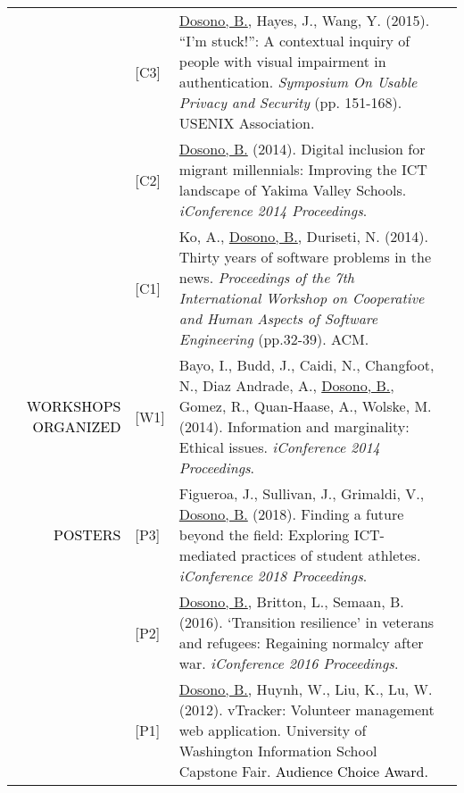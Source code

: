 \documentclass[12pt]{article}
\begin{document}
{{\begin{longtable}{Rp{1.0in}p{0.25in}p{4.75in}}
& \footnotesize{[C3]} & \href{https://www.usenix.org/conference/soups2015/proceedings/presentation/dosono}{{Dosono, B.}}, Hayes, J., Wang, Y. (2015). ``I’m stuck!'': A contextual inquiry of people with visual impairment in authentication. \textit{Symposium On Usable Privacy and Security} (pp. 151-168). USENIX Association. \\

& \footnotesize{[C2]} & \href{http://www.ideals.illinois.edu/handle/2142/47321}{{Dosono, B.}} (2014). Digital inclusion for migrant millennials: Improving the ICT landscape of Yakima Valley Schools. \textit{iConference 2014 Proceedings}. \\

& \footnotesize{[C1]} & Ko, A., \href{http://dl.acm.org/authorize?N41457}{{Dosono, B.}}, Duriseti, N. (2014). Thirty years of software problems in the news. \textit{Proceedings of the 7th International Workshop on Cooperative and Human Aspects of Software Engineering} (pp.32-39). ACM. \\

\textcolor{black}{\footnotesize{\uppercase{Workshops Organized}}} & \footnotesize{[W1]} & Bayo, I., Budd, J., Caidi, N., Changfoot, N., Diaz Andrade, A., \href{http://www.ideals.illinois.edu/handle/2142/47393}{{Dosono, B.}}, Gomez, R., Quan-Haase, A., Wolske, M. (2014). Information and marginality: Ethical issues. \textit{iConference 2014 Proceedings}. \\

\textcolor{black}{\footnotesize{\uppercase{Posters}}} & \footnotesize{[P3]} & Figueroa, J., Sullivan, J., Grimaldi, V., \href{https://www.ideals.illinois.edu/handle/2142/100251}{{Dosono, B.}} (2018). Finding a future beyond the field: Exploring ICT-mediated practices of student athletes. \textit{iConference 2018 Proceedings}. \\

& \footnotesize{[P2]} & \href{http://hdl.handle.net/2142/89348}{{Dosono, B.}}, Britton, L., Semaan, B. (2016). ‘Transition resilience’ in veterans and refugees: Regaining normalcy after war. \textit{iConference 2016 Proceedings}. \\

& \footnotesize{[P1]} & \href{http://youtu.be/i5US90lHIac}{{Dosono, B.}}, Huynh, W., Liu, K., Lu, W. (2012). vTracker: Volunteer management web application. University of Washington Information School Capstone Fair. \textcolor{black}{Audience Choice Award.} \\


\end{longtable}}}
\end{document}
